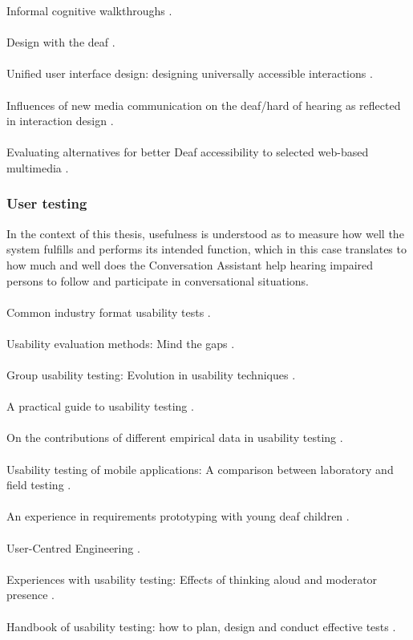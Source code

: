 \documentclass[english, 12pt, a4paper, pdftex, elec, utf8]{aaltothesis}
\begin{document}
Informal cognitive walkthroughs \cite{grigoreanu2013informal}. \\\\
Design with the deaf \cite{potter2014design}. \\\\
Unified user interface design: designing universally accessible interactions \cite{savidis2004unified}. \\\\
Influences of new media communication on the deaf/hard of hearing as reflected in interaction design \cite{chang2016}. \\\\
Evaluating alternatives for better Deaf accessibility to selected web-based multimedia \cite{shiver2015evaluating}.

\subsubsection{User testing}

In the context of this thesis, usefulness is understood as to measure how well the system fulfills and performs its intended function, which in this case translates to how much and well does the Conversation Assistant help hearing impaired persons to follow and participate in conversational situations. \\\\
Common industry format usability tests \cite{bevan1999common}. \\\\
Usability evaluation methods: Mind the gaps \cite{de2009usability}. \\\\
Group usability testing: Evolution in usability techniques \cite{downey2007group}. \\\\
A practical guide to usability testing \cite{dumas1999}. \\\\
On the contributions of different empirical data in usability testing \cite{ebling2000contributions}. \\\\
Usability testing of mobile applications: A comparison between laboratory and field testing \cite{kaikkonen2005}. \\\\
An experience in requirements prototyping with young deaf children \cite{korte2015experience}. \\\\
User-Centred Engineering \cite{richter2014user}. \\\\
Experiences with usability testing: Effects of thinking aloud and moderator presence \cite{riihiaho2015}. \\\\
Handbook of usability testing: how to plan, design and conduct effective tests \cite{rubin2008handbook}. \\\\
\end{document}
